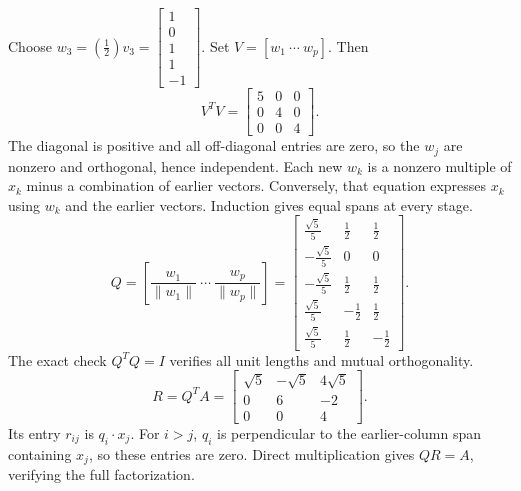 Choose $w_{3}=(\frac{1}{2})v_{3}=\left[\begin{array}{r}1\\0\\1\\1\\-1\end{array}\right]$.
Set $V=[w_1\ \cdots\ w_p]$. Then
\[V^TV=\left[\begin{array}{rrr}5&0&0\\0&4&0\\0&0&4\end{array}\right].\]
The diagonal is positive and all off-diagonal entries are zero, so the $w_j$ are nonzero and orthogonal, hence independent. Each new $w_k$ is a nonzero multiple of $x_k$ minus a combination of earlier vectors. Conversely, that equation expresses $x_k$ using $w_k$ and the earlier vectors. Induction gives equal spans at every stage.
\[Q=\left[\frac{w_1}{\|w_1\|}\ \cdots\ \frac{w_p}{\|w_p\|}\right]=\left[\begin{array}{rrr}\frac{\sqrt{5}}{5}&\frac{1}{2}&\frac{1}{2}\\- \frac{\sqrt{5}}{5}&0&0\\- \frac{\sqrt{5}}{5}&\frac{1}{2}&\frac{1}{2}\\\frac{\sqrt{5}}{5}&- \frac{1}{2}&\frac{1}{2}\\\frac{\sqrt{5}}{5}&\frac{1}{2}&- \frac{1}{2}\end{array}\right].\]
The exact check $Q^TQ=I$ verifies all unit lengths and mutual orthogonality.
\[R=Q^TA=\left[\begin{array}{rrr}\sqrt{5}&- \sqrt{5}&4 \sqrt{5}\\0&6&-2\\0&0&4\end{array}\right].\]
Its entry $r_{ij}$ is $q_i\cdot x_j$. For $i>j$, $q_i$ is perpendicular to the earlier-column span containing $x_j$, so these entries are zero. Direct multiplication gives $QR=A$, verifying the full factorization.

